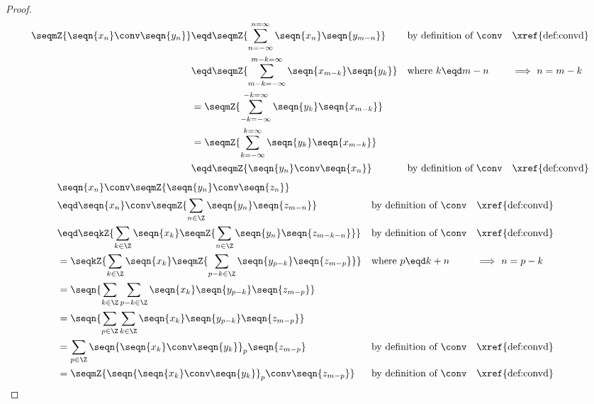 \begin{proof}
\begin{align*}
  \seqmZ{\seqn{x_n}\conv\seqn{y_n}}
    &\eqd \seqmZ{\sum_{n=-\infty}^{n=\infty} \seqn{x_n}\seqn{y_{m-n}}}
    && \text{by definition of $\conv$}
    && \text{\xref{def:convd}}
  \\&\eqd \seqmZ{\sum_{m-k=-\infty}^{m-k=\infty} \seqn{x_{m-k}}\seqn{y_k}}
    && \text{where $k\eqd m-n$}
    && \text{$\implies$ $n=m-k$}
  \\&= \seqmZ{\sum_{-k=-\infty}^{-k=\infty}\seqn{y_k} \seqn{x_{m-k}}}
  \\&= \seqmZ{\sum_{k=-\infty}^{k=\infty}\seqn{y_k} \seqn{x_{m-k}}}
  \\&\eqd \seqmZ{\seqn{y_n}\conv\seqn{x_n}}
    && \text{by definition of $\conv$}
    && \text{\xref{def:convd}}
\end{align*}
\newpage
\begin{align*}
  &\seqn{x_n}\conv\seqmZ{\seqn{y_n}\conv\seqn{z_n}}
  \\&\eqd \seqn{x_n}\conv\seqmZ{\sum_{n\in\Z} \seqn{y_n}\seqn{z_{m-n}}}
    && \text{by definition of $\conv$}
    && \text{\xref{def:convd}}
  \\&\eqd \seqkZ{\sum_{k\in\Z} \seqn{x_k} \seqmZ{\sum_{n\in\Z} \seqn{y_n} \seqn{z_{m-k-n}}}}
    && \text{by definition of $\conv$}
    && \text{\xref{def:convd}}
  \\&= \seqkZ{\sum_{k\in\Z} \seqn{x_k} \seqmZ{\sum_{p-k\in\Z} \seqn{y_{p-k}} \seqn{z_{m-p}}}}
    && \text{where $p\eqd k+n$}
    && \text{$\implies$ $n=p-k$}
  \\&= \seqn{\sum_{k\in\Z} \sum_{p-k\in\Z} \seqn{x_k} \seqn{y_{p-k}} \seqn{z_{m-p}}}
  \\&= \seqn{\sum_{p\in\Z} \sum_{k\in\Z} \seqn{x_k} \seqn{y_{p-k}} \seqn{z_{m-p}}}
  \\&= {\sum_{p\in\Z} \seqn{\seqn{x_k}\conv\seqn{y_k}}_p \seqn{z_{m-p}}}
    && \text{by definition of $\conv$}
    && \text{\xref{def:convd}}
  \\&= \seqmZ{\seqn{\seqn{x_k}\conv\seqn{y_k}}_p \conv\seqn{z_{m-p}}}
    && \text{by definition of $\conv$}
    && \text{\xref{def:convd}}
\end{align*}


\end{proof}
